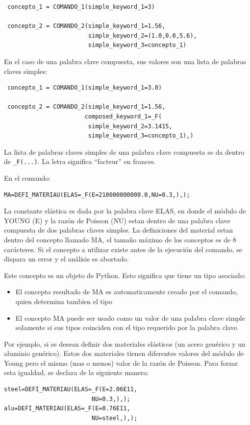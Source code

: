 \documentclass[12pt]{book}
\theoremstyle{definition}
\theoremstyle{remark}
\theoremstyle{plain}
\begin{document}
\begin{verbatim}
 concepto_1 = COMANDO_1(simple_keyword_1=3)

 concepto_2 = COMANDO_2(simple_keyword_1=1.56,
                        simple_keyword_2=(1.0,0.0,5.6),
                        simple_keyword_3=concepto_1)
\end{verbatim}

En el caso de una palabra clave compuesta, sus valores son una lista de palabras claves
simples:

\begin{verbatim}
 concepto_1 = COMANDO_1(simple_keyword_1=3.0)

 concepto_2 = COMANDO_2(simple_keyword_1=1.56,
                       composed_keyword_1=_F(
                        simple_keyword_2=3.1415,
                        simple_keyword_3=concepto_1),)
\end{verbatim}

La lista de palabras claves simples de una palabra clave compuesta se da dentro de
\verb*|_F(...)|. La letra significa ``facteur'' en frances.


En el comando:

\begin{verbatim}
MA=DEFI_MATERIAU(ELAS=_F(E=210000000000.0,NU=0.3,),);
\end{verbatim}

La constante elástica es dada por la palabra clave ELAS, en donde el módulo de YOUNG
(E) y la razón de Poisson (NU) estan dentro de una palabra clave compuesta de
dos palabras claves simples. La definiciones del material estan dentro del concepto
llamado MA, el tamaño máximo de los conceptos es de 8 carácteres. Si el concepto
a utilizar existe antes de la ejecución del comando, se dispara un error y el análisis 
es abortado. 

Este concepto es un objeto de Python. Esto significa que tiene un tipo asociado:
\begin{itemize}
 \item El concepto resultado de MA es automaticamente creado por el comando, 
quien determina tambien el tipo
 \item El concepto MA puede ser usado como un valor de una palabra clave simple
solamente si sus tipos coinciden con el tipo requerido por la palabra clave.
\end{itemize}

Por ejemplo, si se desean definir dos materiales elásticos (un acero genérico y
un aluminio genérico). Estos dos materiales tienen diferentes valores del
módulo de Young pero el mismo (mas o menos) valor de la razón de Poisson. Para
forzar esta igualdad, se declara de la siguiente manera:
\begin{verbatim}
steel=DEFI_MATERIAU(ELAS=_F(E=2.06E11,
                         NU=0.3,),);
alu=DEFI_MATERIAU(ELAS=_F(E=0.76E11,
                         NU=steel,),);
\end{verbatim}
\end{document}
